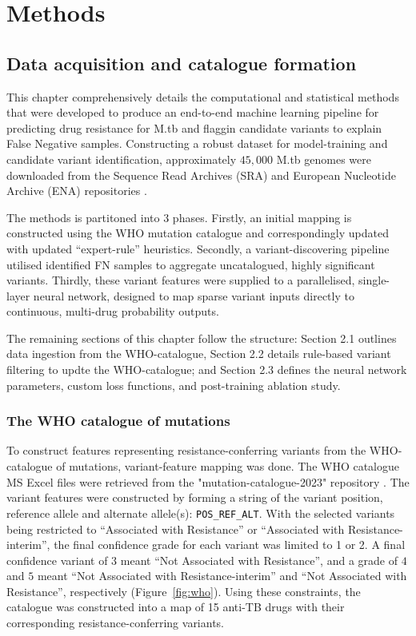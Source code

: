 \graphicspath{{Figures/Methods}}

\chapter{Methods}\label{ch:methods}

\section{Data acquisition and catalogue formation}\label{methods:sec:data_agg}
This chapter comprehensively details the computational and statistical methods that were developed to produce an end-to-end machine learning pipeline for predicting drug resistance for M.tb and flaggin candidate variants to explain False Negative samples. Constructing a robust dataset for model-training and candidate variant identification, approximately $45,000$ M.tb genomes were downloaded from the Sequence Read Archives (SRA) and European Nucleotide Archive (ENA) repositories \cite{sra_infra_2022, ena_infra_2024}.

The methods is partitoned into $3$ phases. Firstly, an initial mapping is constructed using the WHO mutation catalogue \cite{WHOcatalog} and correspondingly updated with updated ``expert-rule'' heuristics. Secondly, a variant-discovering pipeline utilised identified FN samples to aggregate uncatalogued, highly significant variants. Thirdly, these variant features were supplied to a parallelised, single-layer neural network, designed to map sparse variant inputs directly to continuous, multi-drug probability outputs.

The remaining sections of this chapter follow the structure: Section 2.1 outlines data ingestion from the WHO-catalogue, Section 2.2 details rule-based variant filtering to updte the WHO-catalogue; and Section 2.3 defines the neural network parameters, custom loss functions, and post-training ablation study. 

\subsection{The WHO catalogue of mutations}
To construct features representing resistance-conferring variants from the WHO-catalogue of mutations, variant-feature mapping was done. The WHO catalogue MS Excel files were retrieved from the "mutation-catalogue-2023" repository \cite{WHOcatalog}. The variant features were constructed by forming a string of the variant position, reference allele and alternate allele(s): \texttt{POS\_REF\_ALT}. With the selected variants being restricted to ``Associated with Resistance'' or ``Associated with Resistance-interim'', the final confidence grade for each variant was limited to 1 or 2. A final confidence variant of $3$ meant ``Not Associated with Resistance'', and a grade of $4$ and $5$ meant ``Not Associated with Resistance-interim'' and ``Not Associated with Resistance'', respectively \cite{Walker2022, WHOcatalog} (Figure~\ref{fig:who}). Using these constraints, the catalogue was constructed into a map of 15 anti-TB drugs with their corresponding resistance-conferring variants.\\


